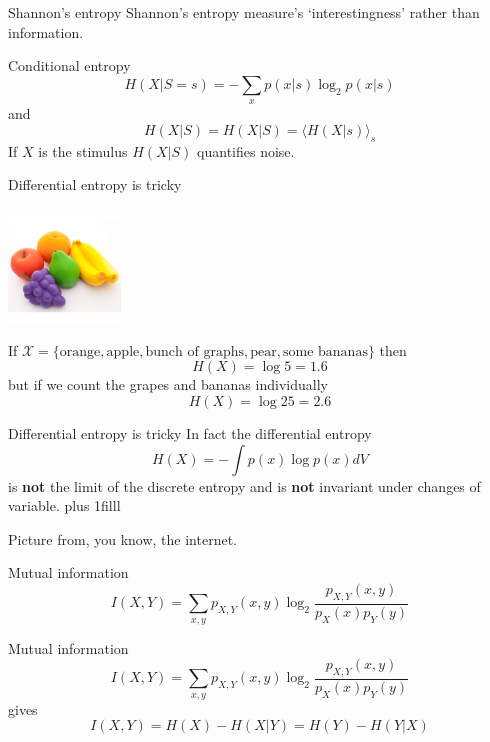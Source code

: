 \documentclass{beamer}
\newcommand{\btVFill}{\vskip0pt plus 1filll}
\begin{document}
\begin{frame}{Shannon's entropy}
  Shannon's entropy measure's \lq{}interestingness\rq{} rather than information.
\end{frame}

\begin{frame}{Conditional entropy}
\color{dark}
  $$
H(X|S=s)=-\sum_x p(x|s)\log_2{p(x|s)}
$$
\color{black}
and
\color{dark}
$$
H(X|S)=H(X|S)=\langle H(X|s)\rangle_s
$$
\color{black}
If $X$ is the stimulus $H(X|S)$ quantifies noise.
\end{frame}

\begin{frame}{Differential entropy is tricky}
  \begin{center}
    \includegraphics[width=3cm]{lanco_fruits_1.png}
  \end{center}
  If $\mathcal{X}=\{\mbox{orange},\mbox{apple},\mbox{bunch of graphs},\mbox{pear},\mbox{some bananas}\}$ then
\color{dark}
  $$H(X)=\log{5}=1.6$$
\color{black}
but if we count the grapes and bananas individually
\color{dark}
  $$H(X)=\log{25}=2.6$$
\color{black}
\end{frame}

\begin{frame}{Differential entropy is tricky}
\vskip 3cm
  In fact the differential entropy
\color{dark}
$$H(X)=-\int p(x)\log{p(x)}dV$$
\color{black}
is \textbf{not} the limit of the discrete entropy and is \textbf{not} invariant under changes of variable.
\btVFill
\color{gray}
\begin{flushright}
\tiny{Picture from, you know, the internet.}
\end{flushright}
\end{frame}

\begin{frame}{Mutual information}
\color{dark}
$$
I(X,Y)=\sum_{x,y} p_{X,Y}(x,y) \log_2{\frac{p_{X,Y}(x,y)}{p_X(x)p_Y(y)}}
$$
\color{black}
\end{frame}


\begin{frame}{Mutual information}
\color{dark}
$$
I(X,Y)=\sum_{x,y} p_{X,Y}(x,y) \log_2{\frac{p_{X,Y}(x,y)}{p_X(x)p_Y(y)}}
$$
\color{black}
gives
\color{dark}
$$
I(X,Y)=H(X)-H(X|Y)=H(Y)-H(Y|X)
$$
\color{black}
\end{frame}
\end{document}
